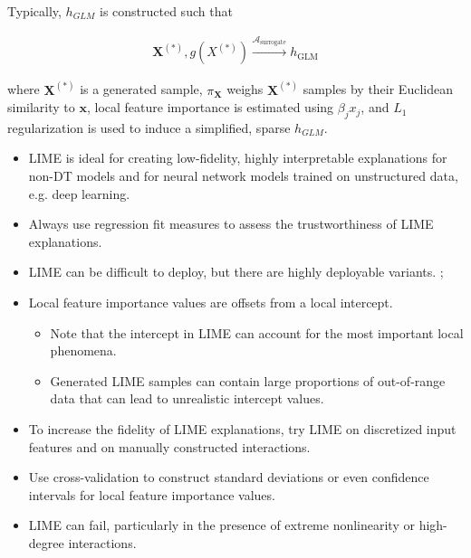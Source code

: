 \documentclass{article}
\begin{document}
\vspace{5pt}

Typically, $h_{GLM}$ is constructed such that

\begin{equation}
\begin{aligned}
\mathbf{X}^{(*)}, g({X}^{(*)}) \xrightarrow{\mathcal{A}_{\text{surrogate}}} h_{\text{GLM}}
\end{aligned}
\end{equation}

where $\mathbf{X}^{(*)}$ is a generated sample, $\pi_{\mathbf{X}}$ weighs $\mathbf{X}^{(*)}$ samples by their Euclidean similarity to $\mathbf{x}$, local feature importance is estimated using $\beta_j x_j$, and $L_1$ regularization is used to induce a simplified, sparse $h_{GLM}$. 		

\begin{itemize}
	
	\item LIME is ideal for creating low-fidelity, highly interpretable explanations for non-DT models and for neural network models trained on unstructured data, e.g. deep learning.
	
	\item Always use regression fit measures to assess the trustworthiness of LIME explanations.
	
	\item LIME can be difficult to deploy, but there are highly deployable variants. \cite{lime-sup}; \cite{h2o_mli_booklet}
	
	\item Local feature importance values are offsets from a local intercept.
	
	\begin{itemize}
		
		\item Note that the intercept in LIME can account for the most important local phenomena.
		
		\item Generated LIME samples can contain large proportions of out-of-range data that can lead to unrealistic intercept values. 
		
	\end{itemize}
	
\end{itemize}

\begin{itemize}
	
	\item To increase the fidelity of LIME explanations, try LIME on discretized input features and on manually constructed interactions.
	
	\item Use cross-validation to construct standard deviations or even confidence intervals for local feature importance values.
	
	\item LIME can fail, particularly in the presence of extreme nonlinearity or high-degree interactions.
	
\end{itemize}
\end{document}
